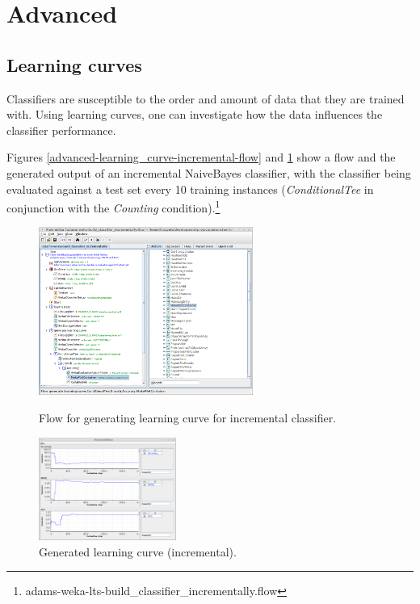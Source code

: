 \newpage
\section{Advanced}

\subsection{Learning curves}
Classifiers are susceptible to the order and amount of data that they are
trained with. Using learning curves, one can investigate how the data
influences the classifier performance.

Figures \ref{advanced-learning_curve-incremental-flow} and \ref{advanced-learning_curve-incremental-output}
show a flow and the generated output of an incremental NaiveBayes classifier, 
with the classifier being evaluated against a test set every 10 training 
instances (\textit{ConditionalTee} in conjunction with the \textit{Counting}
condition).\footnote{adams-weka-lts-build\_classifier\_incrementally.flow}

\begin{figure}[ht]
  \begin{minipage}[t]{0.55\linewidth}
    \centering
    \includegraphics[width=7.0cm]{images/advanced-learning_curve-incremental-flow.png}
    \caption{Flow for generating learning curve for incremental classifier.}
    \label{advanced-learning_curve-incremental-flow}
  \end{minipage}
  \hspace{0.5cm}
  \begin{minipage}[t]{0.45\linewidth}
    \centering
    \includegraphics[width=4.5cm]{images/advanced-learning_curve-incremental-output.png}
    \caption{Generated learning curve (incremental).}
    \label{advanced-learning_curve-incremental-output}
  \end{minipage}
\end{figure}

